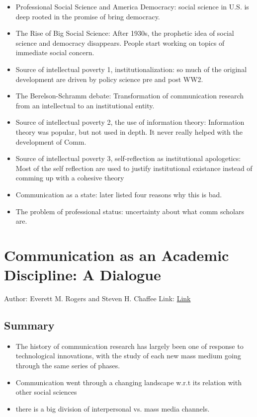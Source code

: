 \begin{itemize}
    \item Professional Social Science and America Democracy: social science in U.S. is deep rooted in the promise of bring democracy. 
    \item The Rise of Big Social Science: After 1930s, the prophetic idea of social science and democracy disappears. People start working on topics of immediate social concern. 
    \item Source of intellectual poverty 1, institutionalization: so much of the original development are driven by policy science pre and post WW2. 
    \item The Berelson-Schramm debate: Transformation of communication research from an intellectual to an institutional entity. 
    \item Source of intellectual poverty 2, the use of information theory: Information theory was popular, but not used in depth. It never really helped with the development of Comm. 
    \item Source of intellectual poverty 3, self-reflection as institutional apologetics: Most of the self reflection are used to justify institutional existance instead of comming up with a cohesive theory 
    \item Communication as a state: later listed four reasons why this is bad. 
    \item The problem of professional status: uncertainty about what comm scholars are. 
\end{itemize}




\section{Communication as an Academic Discipline: A Dialogue} 
Author: Everett M. Rogers and Steven H. Chaffee 
Link: \href{https://academic.oup.com/joc/article-abstract/33/3/18/4282731?redirectedFrom=fulltext}{Link}

\subsection{Summary}
    \begin{itemize}
        \item The history of communication research has largely been one of response to technological innovations, with the study of each new mass medium going through the same series of phases. 
        \item Communication went through a changing landscape w.r.t its relation with other social sciences 
        \item there is a big division of interpersonal vs. mass media channels. 
    \end{itemize}
    




